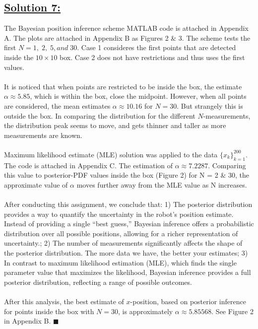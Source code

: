 \documentclass[a4paper,11pt]{article}
\begin{document}
\subsection*{\underline{Solution 7:}}
The Bayesian position inference scheme MATLAB code is attached in Appendix A. The plots are attached in Appendix B as Figures 2 \& 3. The scheme tests the first $N = 1,\; 2, \; 5, and \; 30$. Case 1 consideres the first points that are detected inside the $10 \times 10$ box. Case 2 does not have restrictions and thus uses the first values.\\ \\
It is noticed that when points are restricted to be inside the box, the estimate $\alpha \approx 5.85$, which is within the box, close the midpoint. However, when all points are considered, the mean estimates $\alpha \approx 10.16$ for $N = 30$. But strangely this is outside the box.
In comparing the distribution for the different $N$-measurements, the distribution peak seems to move, and gets thinner and taller as more measurements are known. \\ \\
Maximum likelihood estimate (MLE) solution was applied to the data $\{ x_k \}^{200} _{k = 1}$. The code is attached in Appendix C. The estimation of $\alpha \approx 7.2287$. Comparing this value to posterior-PDF values inside the box (Figure 2) for N = 2 \& 30, the approximate value of $\alpha$ moves further away from the MLE value as N increases.\\\\
After conducting this assignment, we conclude that: 1) The posterior distribution provides a way to quantify the uncertainty in the robot's position estimate. Instead of providing a single “best guess,” Bayesian inference offers a probabilistic distribution over all possible positions, allowing for a richer representation of uncertainty.; 2) The number of measurements significantly affects the shape of the posterior distribution. The more data we have, the better your estimates; 3) In contrast to maximum likelihood estimation (MLE), which finds the single parameter value that maximizes the likelihood, Bayesian inference provides a full posterior distribution, reflecting a range of possible outcomes.\\ \\
After this analysis, the best estimate of $x$-position, based on posterior inference for points inside the box with $N = 30$, is approximately $\alpha \approx 5.85568$. See Figure 2 in Appendix B. $\blacksquare$
\end{document}
